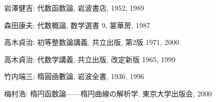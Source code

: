 \documentclass[12pt,twoside]{jarticle}
\begin{document}
\bigskip\bigskip{}


\begin{thebibliography}{AB}



岩澤健吉: 代数函数論, 岩波書店, 1952, 1989


森田康夫: 代数概論, 数学選書 9, 裳華房, 1987




高木貞治: 初等整数論講義, 共立出版, 第2版 1971, 2000

高木貞治: 代数学講義, 共立出版, 改定新版 1965, 1999

竹内端三: 楕圓凾數論, 岩波全書, 1936, 1996


梅村浩: 楕円函数論——楕円曲線の解析学, 東京大学出版会, 2000

\end{thebibliography}

\end{document}
